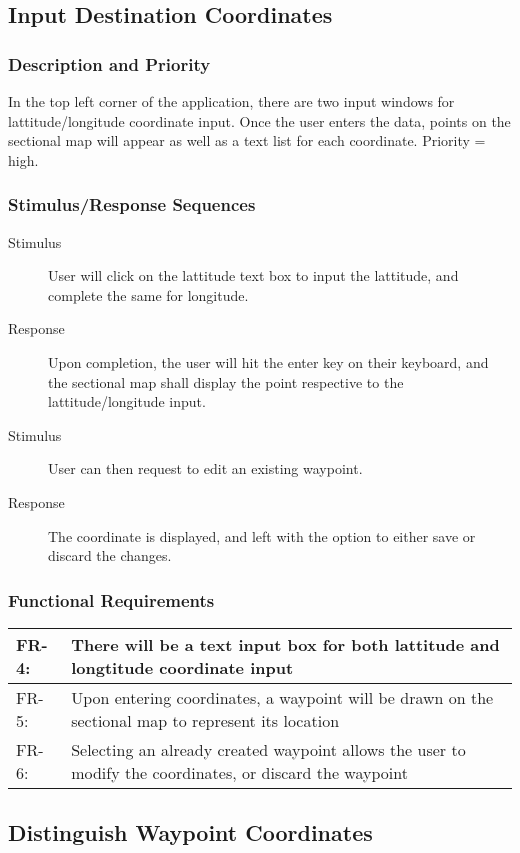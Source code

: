 \documentclass[12pt, letterpaper]{article}
\begin{document}
  \subsection{Input Destination Coordinates}
	
    \subsubsection{Description and Priority}
		In the top left corner of the application, there are two input windows for 
		lattitude/longitude coordinate input. Once the user enters the data, 
		points on the sectional map will appear as well as a text list for each 
		coordinate. Priority = high.
    \subsubsection{Stimulus/Response Sequences}
      \begin{description}
        \item[Stimulus] User will click on the lattitude text box to input the 
			lattitude, and complete the same for longitude.
		\item[Response] Upon completion, the user will hit the enter key on their
			keyboard, and the sectional map shall display the point respective
			to the lattitude/longitude input.
		\item[Stimulus] User can then request to edit an existing waypoint.
		\item[Response] The coordinate is displayed, and left with the option to
			either save or discard the changes.
      \end{description}
    \subsubsection{Functional Requirements}
    \begin{tabularx}{\textwidth}{|l|X|} \hline
      FR-4: & There will be a text input box for both lattitude and longtitude coordinate input\\ \hline
      FR-5: & Upon entering coordinates, a waypoint will be drawn on the sectional map to represent its location\\ \hline
      FR-6: & Selecting an already created waypoint allows the user to modify the coordinates, or discard the waypoint\\ \hline
      \end{tabularx} 

    \subsection{Distinguish Waypoint Coordinates}
\end{document}
